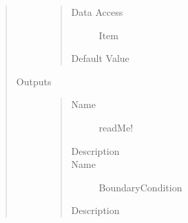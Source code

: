 \documentclass[letterpaper,10pt,english]{sphinxmanual}
\begin{document}
\begin{quote}
\begin{description}
\begin{quote}
\begin{description}
\item[{Data Access}] \leavevmode
Item

\item[{Default Value}] \leavevmode
{}

\end{description}\end{quote}

\item[{Outputs}] \leavevmode\begin{quote}\begin{description}
\item[{Name}] \leavevmode
readMe!

\item[{Description}] \leavevmode
{}

\item[{Name}] \leavevmode
BoundaryCondition

\item[{Description}] \leavevmode
{}

\end{description}\end{quote}

\end{description}\end{quote}
\end{document}
